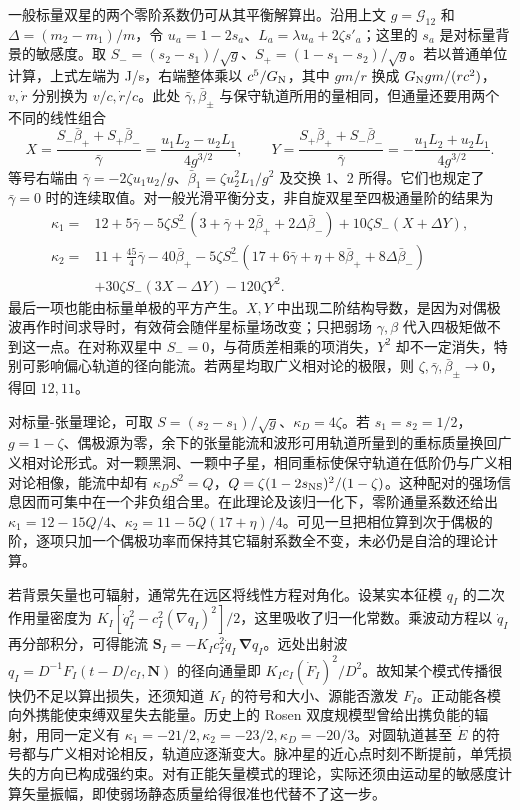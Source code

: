 一般标量双星的两个零阶系数仍可从其平衡解算出。沿用上文 $g=\mathcal G_{12}$ 和 $\Delta=(m_2-m_1)/m$，令 $u_a=1-2s_a$、$L_a=\lambda u_a+2\zeta s'_a$；这里的 $s_a$ 是对标量背景的敏感度。取 $S_-=(s_2-s_1)/\sqrt g$、$S_+=(1-s_1-s_2)/\sqrt g$。若以普通单位计算，上式左端为 J/s，右端整体乘以 $c^5/G_{\rm N}$，其中 $gm/r$ 换成 $G_{\rm N}gm/(rc^2)$，$v,\dot r$ 分别换为 $v/c,\dot r/c$。此处 $\bar\gamma,\bar\beta_\pm$ 与保守轨道所用的量相同，但通量还要用两个不同的线性组合
\[
 X=\frac{S_-\bar\beta_++S_+\bar\beta_-}{\bar\gamma}
   =\frac{u_1L_2-u_2L_1}{4g^{3/2}},\qquad
 Y=\frac{S_+\bar\beta_++S_-\bar\beta_-}{\bar\gamma}
   =-\frac{u_1L_2+u_2L_1}{4g^{3/2}} .
\]
等号右端由 $\bar\gamma=-2\zeta u_1u_2/g$、$\bar\beta_1=\zeta u_2^2 L_1/g^2$ 及交换 1、2 所得。它们也规定了 $\bar\gamma=0$ 时的连续取值。对一般光滑平衡分支，非自旋双星至四极通量阶的结果为
\begin{align*}
 \kappa_1={}&12+5\bar\gamma
  -5\zeta S_-^2(3+\bar\gamma+2\bar\beta_++2\Delta\bar\beta_-)
  +10\zeta S_-(X+\Delta Y),\\
 \kappa_2={}&11+\tfrac{45}{4}\bar\gamma-40\bar\beta_+
  -5\zeta S_-^2(17+6\bar\gamma+\eta+8\bar\beta_++8\Delta\bar\beta_-)\\
 &+30\zeta S_-(3X-\Delta Y)-120\zeta Y^2 .
\end{align*}
最后一项也能由标量单极的平方产生。$X,Y$ 中出现二阶结构导数，是因为对偶极波再作时间求导时，有效荷会随伴星标量场改变；只把弱场 $\gamma,\beta$ 代入四极矩做不到这一点。在对称双星中 $S_-=0$，与荷质差相乘的项消失，$Y^2$ 却不一定消失，特别可影响偏心轨道的径向能流。若两星均取广义相对论的极限，则 $\zeta,\bar\gamma,\bar\beta_\pm\to0$，得回 $12,11$。

对标量-张量理论，可取 $S=(s_2-s_1)/\sqrt g$、$\kappa_D=4\zeta$。若 $s_1=s_2=1/2$，$g=1-\zeta$、偶极源为零，余下的张量能流和波形可用轨道所量到的重标质量换回广义相对论形式。对一颗黑洞、一颗中子星，相同重标使保守轨道在低阶仍与广义相对论相像，能流中却有 $\kappa_D S^2=Q$，$Q=\zeta(1-2s_{\rm NS})^2/(1-\zeta)$。这种配对的强场信息因而可集中在一个非负组合里。在此理论及该归一化下，零阶通量系数还给出 $\kappa_1=12-15Q/4$、$\kappa_2=11-5Q(17+\eta)/4$。可见一旦把相位算到次于偶极的阶，逐项只加一个偶极功率而保持其它辐射系数全不变，未必仍是自洽的理论计算。

若背景矢量也可辐射，通常先在远区将线性方程对角化。设某实本征模 $q_I$ 的二次作用量密度为 $K_I[\dot q_I^2-c_I^2(\nabla q_I)^2]/2$，这里吸收了归一化常数。乘波动方程以 $\dot q_I$ 再分部积分，可得能流 $\bm S_I=-K_I c_I^2\dot q_I\,\bm\nabla q_I$。远处出射波 $q_I=D^{-1}F_I(t-D/c_I,\bm N)$ 的径向通量即 $K_I c_I(\dot F_I)^2/D^2$。故知某个模式传播很快仍不足以算出损失，还须知道 $K_I$ 的符号和大小、源能否激发 $F_I$。正动能各模向外携能使束缚双星失去能量。历史上的 Rosen 双度规模型曾给出携负能的辐射，用同一定义有 $\kappa_1=-21/2,\kappa_2=-23/2,\kappa_D=-20/3$。对圆轨道甚至 $\dot E$ 的符号都与广义相对论相反，轨道应逐渐变大。脉冲星的近心点时刻不断提前，单凭损失的方向已构成强约束。对有正能矢量模式的理论，实际还须由运动星的敏感度计算矢量振幅，即使弱场静态质量给得很准也代替不了这一步。

